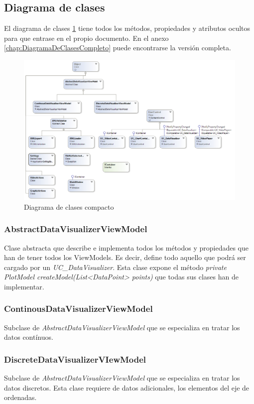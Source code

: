 \subsection{Diagrama de clases}
El diagrama de clases \ref{fig:ClassDiagram} tiene todos los m\'etodos, propiedades y atributos ocultos para que entrase
en el propio documento. En el anexo \ref{chap:DiagramaDeClasesCompleto} puede encontrarse la versi\'on completa.

\begin{figure}[H]
	\centering
	\includegraphics[width=1.2\linewidth]{./Figures/ClassDiagram}
	\caption[Diagrama de clases compacto]{Diagrama de clases compacto}
	\label{fig:ClassDiagram}
\end{figure}

\subsubsection{AbstractDataVisualizerViewModel}
Clase abstracta que describe e implementa todos los m\'etodos y propiedades que han de tener todos los ViewModels. Es decir,
define todo aquello que podr\'a ser cargado por un \emph{UC\_DataVisualizer}. Esta clase expone el m\'etodo
\emph{private PlotModel createModel(List<DataPoint> points)}
que todas sus clases han de implementar.

\subsubsection{ContinousDataVisualizerViewModel}
Subclase de \emph{AbstractDataVisualizerViewModel} que se especializa en tratar los datos cont\'inuos. 

\subsubsection{DiscreteDataVisualizerVIewModel}
Subclase de \emph{AbstractDataVisualizerViewModel} que se especializa en tratar los datos discretos.
Esta clase requiere de datos adicionales, los elementos del eje de ordenadas.


